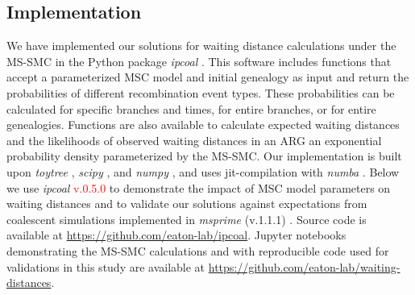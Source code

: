 \documentclass[11pt]{article}
\begin{document}
\subsection{Implementation}
We have implemented our solutions for waiting distance calculations
under the MS-SMC in the Python package \emph{ipcoal} \citep{mckenzie_ipcoal_2020}.
This software includes functions that accept a parameterized MSC model and 
initial genealogy as input and return the probabilities of different 
recombination event types. These probabilities can be calculated for specific 
branches and times, for entire branches, or for entire genealogies. 
Functions are also available to calculate expected waiting distances 
and the likelihoods of observed waiting distances in an ARG 
an exponential probability density parameterized by the MS-SMC.
Our implementation is built upon \emph{toytree} \citep{eaton_toytree_2020}, 
\emph{scipy} \citep{2020SciPy-NMeth}, and 
\emph{numpy} \citep{harris2020array}, and 
uses jit-compilation with \emph{numba} 
\citep{lam2015numba}.
Below we use \emph{ipcoal} 
\textcolor{red}{v.0.5.0} 
to demonstrate the impact of 
MSC model parameters on waiting distances and to validate our solutions against 
expectations from coalescent simulations implemented in 
\emph{msprime} (v.1.1.1) \citep{baumdicker_efficient_2022}.
Source code is available at \url{https://github.com/eaton-lab/ipcoal}.
Jupyter notebooks demonstrating the MS-SMC calculations and with 
reproducible code used for validations in this study are available
at \url{https://github.com/eaton-lab/waiting-distances}.
\end{document}
